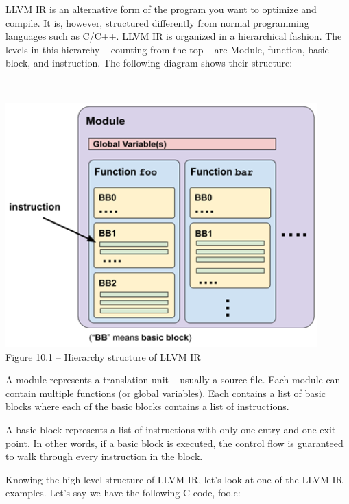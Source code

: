 LLVM IR is an alternative form of the program you want to optimize and compile. It is, however, structured differently from normal programming languages such as C/C++. LLVM IR is organized in a hierarchical fashion. The levels in this hierarchy – counting from the top – are Module, function, basic block, and instruction. The following diagram shows their structure:

\hspace*{\fill} \\ %
\begin{center}
\includegraphics[width=0.9\textwidth]{content/3/chapter10/images/1.png}\\
Figure 10.1 – Hierarchy structure of LLVM IR
\end{center}

A module represents a translation unit – usually a source file. Each module can contain multiple functions (or global variables). Each contains a list of basic blocks where each of the basic blocks contains a list of instructions.

\begin{tcolorbox}[colback=blue!5!white,colframe=blue!75!black, fonttitle=\bfseries,title=Quick refresher – basic block]	
\hspace*{0.7cm}A basic block represents a list of instructions with only one entry and one exit point. In other words, if a basic block is executed, the control flow is guaranteed to walk through every instruction in the block.
\end{tcolorbox}

Knowing the high-level structure of LLVM IR, let's look at one of the LLVM IR examples. Let's say we have the following C code, foo.c:

